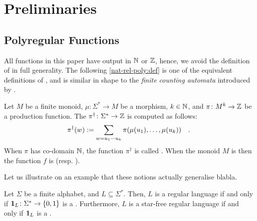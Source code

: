 \section{Preliminaries}
\label{preliminaries:sec}

\subsection{Polyregular Functions}

All functions in this paper have output in $\mathbb{N}$ or $\mathbb{Z}$,
hence, we avoid the definition of 
in full generality. The following \cref{nat-rel-poly:def}
is one of the equivalent definitions of \cite{LOPEZ23b},
and is similar in shape to the \emph{finite counting automata}
introduced by \textcite{schutzenberger1962}.

\begin{definition}
    \label{nat-rel-poly:def}
    Let $M$ be a finite monoid, $\mu \colon \Sigma^* \to M$
    be a morphism, $k \in \mathbb{N}$, and 
    $\pi \colon M^k \to \mathbb{Z}$ be a production function.
    The 
    $\pi^\dagger \colon \Sigma^* \to \mathbb{Z}$
    is computed as follows:
    \begin{equation*}
        \pi^\dagger (w) \mathrel{:=}
        \sum_{w = u_1 \cdots u_k} \pi(\mu(u_1), \dots, \mu(u_k))
        \quad .
    \end{equation*}
    When $\pi$ has co-domain $\mathbb{N}$, the function $\pi^\dagger$
    is called .
    When the monoid $M$ is 
    then
    the function $f$ is 
    (resp. ).
\end{definition}




Let us illustrate on an example that these notions actually generalise
blabla.

\begin{example}
    \label{regular-language:ex}
    Let $\Sigma$ be a finite alphabet, and
    $L \subseteq \Sigma^*$. Then,
    $L$ is a regular language if and only if
    $\mathbf{1}_{L} \colon \Sigma^* \to \mathopen{\{} 0,1 \mathclose{\}}$ is a
    .
    Furthermore, $L$ is a star-free regular language
    if and only if $\mathbf{1}_{L}$ is a
    .
\end{example}


